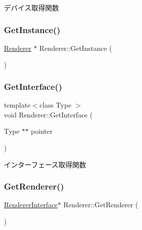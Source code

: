デバイス取得関数 

\mbox{\label{class_renderer_a8c287bd7009d4717336ab1a9e1a556bd}} 
\subsubsection{\texorpdfstring{Get\+Instance()}{GetInstance()}}
{\footnotesize\ttfamily \mbox{\hyperlink{class_renderer}{Renderer}} $\ast$ Renderer\+::\+Get\+Instance (\begin{DoxyParamCaption}{ }\end{DoxyParamCaption})\hspace{0.3cm}{\ttfamily [static]}}

\mbox{\label{class_renderer_a15585698849fcba4722ac0f00b8b62e6}} 
\subsubsection{\texorpdfstring{Get\+Interface()}{GetInterface()}}
{\footnotesize\ttfamily template$<$class Type $>$ \\
void Renderer\+::\+Get\+Interface (\begin{DoxyParamCaption}\item[{Type $\ast$$\ast$}]{pointer }\end{DoxyParamCaption})\hspace{0.3cm}{\ttfamily [inline]}}



インターフェース取得関数 

\mbox{\label{class_renderer_a4ee43ba8d87142ff334ae7016cae9050}} 
\subsubsection{\texorpdfstring{Get\+Renderer()}{GetRenderer()}}
{\footnotesize\ttfamily \mbox{\hyperlink{class_renderer_interface}{Renderer\+Interface}}$\ast$ Renderer\+::\+Get\+Renderer (\begin{DoxyParamCaption}{ }\end{DoxyParamCaption})\hspace{0.3cm}{\ttfamily [inline]}}



